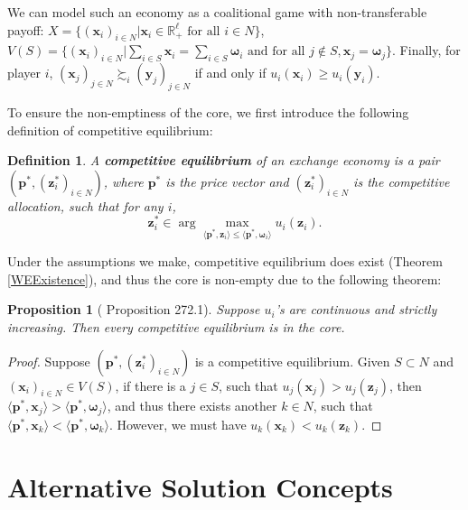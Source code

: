 \documentclass[openany]{book}
\newtheorem{definition}{Definition}[chapter]
\newtheorem{proposition}{Proposition}[chapter]
\theoremstyle{remark}
\begin{document}
We can model such an economy as a coalitional game with non-transferable payoff: $X=\{(\boldsymbol{x}_i)_{i\in N}|\boldsymbol{x}_i\in \mathbb{R}_+^{\ell}\textrm{ for all }i\in N\}$, $V(S)=\{(\boldsymbol{x}_i)_{i\in N}|\sum_{i\in S}^{}\boldsymbol{x}_i=\sum_{i\in S}^{}\boldsymbol{\omega}_i\textrm{ and for all }j\not\in S,\boldsymbol{x}_j=\boldsymbol{\omega}_j\}$. Finally, for player $i$, $(\boldsymbol{x}_j)_{j\in N}\succsim_i(\boldsymbol{y}_j)_{j\in N}$ if and only if $u_i(\boldsymbol{x}_i)\ge u_i(\boldsymbol{y}_i)$.

To ensure the non-emptiness of the core, we first introduce the following definition of competitive equilibrium:
\begin{definition}\label{CEBudget}
    A \textbf{competitive equilibrium} of an exchange economy is a pair $(\boldsymbol{p}^*,(\boldsymbol{z}_i^*)_{i\in N})$, where $\boldsymbol{p}^*$ is the price vector and $(\boldsymbol{z}_i^*)_{i\in N}$ is the competitive allocation, such that for any $i$,
    \begin{equation}
        \boldsymbol{z}_i^*\in\arg\max_{\langle \boldsymbol{p}^*,\boldsymbol{z}_i\rangle\le \langle \boldsymbol{p}^*,\boldsymbol{\omega}_i\rangle}u_i(\boldsymbol{z}_i).
    \end{equation}
\end{definition}
Under the assumptions we make, competitive equilibrium does exist (Theorem \ref{WEExistence}), and thus the core is non-empty due to the following theorem:
\begin{proposition}[\cite{OR94} Proposition 272.1]\label{CEBudgetCore}
    Suppose $u_i$'s are continuous and strictly increasing. Then every competitive equilibrium is in the core.
\end{proposition}
\begin{proof}
    Suppose $(\boldsymbol{p}^*,(\boldsymbol{z}_i^*)_{i\in N})$ is a competitive equilibrium. Given $S\subset N$ and $(\boldsymbol{x}_i)_{i\in N}\in V(S)$, if there is a $j\in S$, such that $u_j(\boldsymbol{x}_j)>u_j(\boldsymbol{z}_j)$, then $\langle \boldsymbol{p}^*,\boldsymbol{x}_j\rangle>\langle \boldsymbol{p}^*,\boldsymbol{\omega}_j\rangle$, and thus there exists another $k\in N$, such that $\langle \boldsymbol{p}^*,\boldsymbol{x}_k\rangle<\langle \boldsymbol{p}^*,\boldsymbol{\omega}_k\rangle$. However, we must have $u_k(\boldsymbol{x}_k)<u_k(\boldsymbol{z}_k)$.
\end{proof}

\section{Alternative Solution Concepts}
\end{document}
